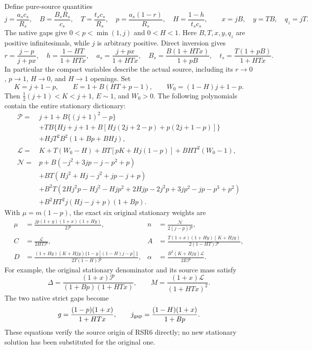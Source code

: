 Define pure-source quantities
\[
 j=\frac{a_sc_s}{R_s},\quad B=\frac{B_sR_s}{c_s},\quad
 T=\frac{t_sc_s}{R_s},\quad p=\frac{a_s(1-r)}{R_s},\quad
 H=\frac{1-h}{t_sc_s},
 \qquad x=jB,\quad y=TB,\quad q_z=jT .
 \tag{RSR2}
\]
The native gaps give $0<p<\min(1,j)$ and $0<H<1$.
Here $B,T,x,y,q_z$ are positive infinitesimals, while $j$ is arbitrary
positive. Direct inversion gives
\[
 r=\frac{j-p}{j+px},\quad h=\frac{1-HT}{1+HTx},\quad
 a_s=\frac{j+px}{1+HTx},\quad
 B_s=\frac{B(1+HTx)}{1+pB},\quad
 t_s=\frac{T(1+pB)}{1+HTx}.
 \tag{RSR3}
\]
In particular the compact variables describe the actual source,
including its $r\to0$, $p\to1$, $H\to0$, and $H\to1$ openings.
Set
\[
 K=j+1-p,\qquad E=1+B(HT+p-1),\qquad
 W_0=(1-H)j+1-p.
 \tag{RSR4}
\]
Then $\tfrac12(j+1)<K<j+1$, $E\sim1$, and $W_0>0$.
The following polynomials contain the entire stationary dictionary:
\begin{align*}
\mathcal P={}&j+1+B\{(j+1)^2-p\}\\
 &+TB\{Hj+j+1+B[Hj(2j+2-p)+p(2j+1-p)]\}\\
 &+HjT^2B^2(1+Bp+BHj),\\
\mathcal L={}&K+T(W_0-H)+BT[pK+Hj(1-p)]+BHT^2(W_0-1),\\
\mathcal N={}&p+B(-j^2+3jp-j-p^2+p)\\
 &+BT(Hj^2+Hj-j^2+jp-j+p)\\
 &+B^2T(2Hj^2p-Hj^2-Hjp^2+2Hjp
             -2j^2p+3jp^2-jp-p^3+p^2)\\
 &+B^2HT^2j(Hj-j+p)(1+Bp).
 \tag{RSR5}
\end{align*}
With $\mu=m(1-p)$, the exact six original stationary weights are
\[
\begin{aligned}
 \mu&=\frac{jp(1+y)(1+x)(1+Hy)}{2\mathcal P},&
 n&=\frac{\mathcal N}{2(j-p)\mathcal P},\\
 C&=\frac{\mathcal L}{2HT\mathcal P},&
 A&=\frac{T(1+x)(1+Hy)(K+Hjy)}{2(1-HT)\mathcal P},\\
 D&=\frac{(1+Hy)(K+Hjy)\{1-y[(1-H)j-p]\}}
             {2T(1-H)\mathcal P},&
 \alpha&=\frac{B^2(K+Hjy)\mathcal L}{2E\mathcal P}.
\end{aligned}
 \tag{RSR6}
\]
For example, the original stationary denominator and its source mass
satisfy
\[
 \Delta=\frac{(1+x)\mathcal P}{(1+Bp)(1+HTx)},\qquad
 M=\frac{(1+x)\mathcal L}{(1+HTx)^2}.
\]
The two native strict gaps become
\[
 g=\frac{(1-p)(1+x)}{1+HTx},\qquad
 j_{\rm gap}=\frac{(1-H)(1+x)}{1+Bp}.
\]
These equations verify the source origin of RSR6 directly; no new
stationary solution has been substituted for the original one.

